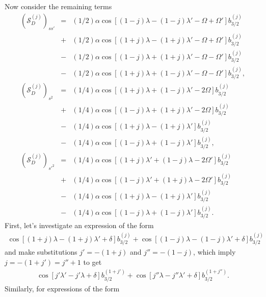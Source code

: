 \documentclass [12pt, a4paper] {article}
\begin{document}
Now consider the remaining terms 
\begin {eqnarray}
    \left(\mathcal{S}_D^{(j)}\right)_{ss'} &=& 
    (1/2)\alpha\cos[(1-j)\lambda - (1-j)\lambda' - \Omega + \Omega']
    b_{3/2}^{(j)}
    \\\nonumber
    &+&
    (1/2)\alpha\cos[(1+j)\lambda - (1+j)\lambda' - \Omega + \Omega']
    b_{3/2}^{(j)}
    \\\nonumber
    &-&
    (1/2)\alpha\cos[(1-j)\lambda + (1+j)\lambda' - \Omega - \Omega']
    b_{3/2}^{(j)}
    \\\nonumber
    &-&
    (1/2)\alpha\cos[(1+j)\lambda + (1-j)\lambda' - \Omega - \Omega']
    b_{3/2}^{(j)},
    \\
    \left(\mathcal{S}_D^{(j)}\right)_{s^2} &=& 
    (1/4)\alpha\cos[(1+j)\lambda + (1-j)\lambda' - 2\Omega] 
    b_{3/2}^{(j)}
    \\\nonumber 
    &+&
    (1/4)\alpha\cos[(1-j)\lambda + (1+j)\lambda' - 2\Omega] 
    b_{3/2}^{(j)}
    \\\nonumber 
    &-&
    (1/4)\alpha\cos[(1+j)\lambda - (1+j)\lambda'] 
    b_{3/2}^{(j)}
    \\\nonumber 
    &-&
    (1/4)\alpha\cos[(1-j)\lambda + (1-j)\lambda']
    b_{3/2}^{(j)},
    \\
    \left(\mathcal{S}_D^{(j)}\right)_{s'^2} &=& 
    (1/4)\alpha\cos[(1+j)\lambda' + (1-j)\lambda - 2\Omega'] 
    b_{3/2}^{(j)}
    \\\nonumber 
    &+&
    (1/4)\alpha\cos[(1-j)\lambda' + (1+j)\lambda - 2\Omega'] 
    b_{3/2}^{(j)}
    \\\nonumber 
    &-&
    (1/4)\alpha\cos[(1+j)\lambda - (1+j)\lambda'] 
    b_{3/2}^{(j)}
    \\\nonumber 
    &-&
    (1/4)\alpha\cos[(1-j)\lambda + (1-j)\lambda']
    b_{3/2}^{(j)}.
\end {eqnarray}
First, let's investigate an expression of the form 
\begin {eqnarray}
    \cos[(1+j)\lambda - (1+j)\lambda' + \delta]
    b_{3/2}^{(j)}
    +
    \cos[(1-j)\lambda - (1-j)\lambda' + \delta]
    b_{3/2}^{(j)}
\end {eqnarray}
and make substitutions $j'=-(1+j)$ and $j''=-(1-j)$, which imply 
$j= - (1 + j') = j'' + 1$ to get
\begin {eqnarray}
    \cos[j'\lambda' - j'\lambda + \delta]
    b_{3/2}^{(1 + j')}
    +
    \cos[j''\lambda - j''\lambda' + \delta]
    b_{3/2}^{(1 + j'')}.
\end {eqnarray}
Similarly, for expressions of the form 
\end{document}
